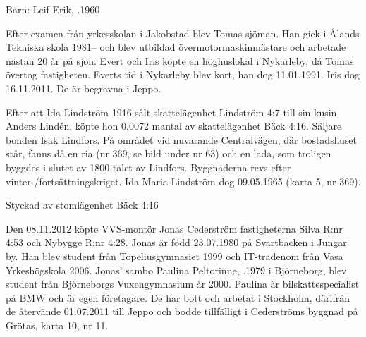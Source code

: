 Barn: 	 Leif Erik,	.1960

Efter examen från yrkesskolan i Jakobstad blev Tomas sjöman. Han gick i Ålands Tekniska skola 1981-- och blev utbildad övermotormaskinmästare och arbetade nästan 20 år på sjön. Evert och Iris köpte en höghuslokal i Nykarleby, då Tomas övertog fastigheten. Everts tid i Nykarleby blev kort, han dog 11.01.1991. Iris dog 16.11.2011. De är begravna i Jeppo.


%
Efter att Ida Lindström 1916 sålt skattelägenhet Lindström 4:7 till sin	kusin Anders Lindén, köpte hon 0,0072 mantal av skattelägenhet Bäck 4:16. Säljare bonden Isak Lindfors. På området vid nuvarande Centralvägen, där bostadshuset står, fanns då en ria (nr 369, se bild under nr 63) och en lada, som troligen byggdes i slutet av 1800-talet av Lindfors. Byggnaderna revs efter vinter-/fortsättningskriget. Ida Maria Lindström dog 09.05.1965 (karta 5, nr 369).



%

Styckad av stomlägenhet Bäck 4:16


%
Den 08.11.2012 köpte VVS-montör Jonas Cederström fastigheterna Silva R:nr 4:53 och Nybygge R:nr 4:28. Jonas är född 23.07.1980 på Svartbacken i Jungar by. Han blev student från Topeliusgymnasiet 1999 och IT-tradenom från Vasa Yrkeshögskola 2006. Jonas' sambo Paulina Peltorinne, .1979 i Björneborg, blev student från Björneborgs Vuxengymnasium år 2000. Paulina är bilskattespecialist på BMW och är egen företagare. De har bott och arbetat i Stockholm, därifrån de återvände 01.07.2011 till Jeppo och bodde tillfälligt i Cederströms byggnad på Grötas, karta 10, nr 11.
\begin{jhchildren}
  \item {}
  \item {}
\end{jhchildren}


